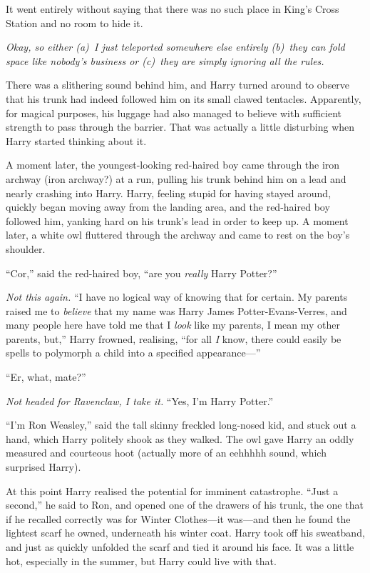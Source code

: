 It went entirely without saying that there was no such place in King’s Cross Station and no room to hide it.

\emph{Okay, so either (a)~I just teleported somewhere else entirely (b)~they can fold space like nobody’s business or (c)~they are simply ignoring all the rules.}

There was a slithering sound behind him, and Harry turned around to observe that his trunk had indeed followed him on its small clawed tentacles. Apparently, for magical purposes, his luggage had also managed to believe with sufficient strength to pass through the barrier. That was actually a little disturbing when Harry started thinking about it.

A moment later, the youngest-looking red-haired boy came through the iron archway (iron archway?) at a run, pulling his trunk behind him on a lead and nearly crashing into Harry. Harry, feeling stupid for having stayed around, quickly began moving away from the landing area, and the red-haired boy followed him, yanking hard on his trunk’s lead in order to keep up. A moment later, a white owl fluttered through the archway and came to rest on the boy’s shoulder.

“Cor,” said the red-haired boy, “are you \emph{really} Harry Potter?”

\emph{Not this again.} “I have no logical way of knowing that for certain. My parents raised me to \emph{believe} that my name was Harry James Potter-Evans-Verres, and many people here have told me that I \emph{look} like my parents, I mean my other parents, but,” Harry frowned, realising, “for all \emph{I} know, there could easily be spells to polymorph a child into a specified appearance—”

“Er, what, mate?”

\emph{Not headed for Ravenclaw, I take it.} “Yes, I’m Harry Potter.”

“I’m Ron Weasley,” said the tall skinny freckled long-nosed kid, and stuck out a hand, which Harry politely shook as they walked. The owl gave Harry an oddly measured and courteous hoot (actually more of an eehhhhh sound, which surprised Harry).

At this point Harry realised the potential for imminent catastrophe. “Just a second,” he said to Ron, and opened one of the drawers of his trunk, the one that if he recalled correctly was for Winter Clothes—it was—and then he found the lightest scarf he owned, underneath his winter coat. Harry took off his sweatband, and just as quickly unfolded the scarf and tied it around his face. It was a little hot, especially in the summer, but Harry could live with that.

